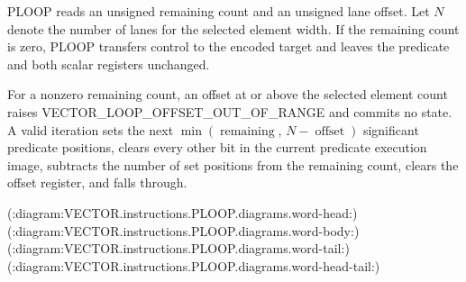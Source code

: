 PLOOP reads an unsigned remaining count and an unsigned lane offset. Let $N$
denote the number of lanes for the selected element width. If the remaining
count is zero, PLOOP transfers control to the encoded target and leaves the
predicate and both scalar registers unchanged.

For a nonzero remaining count, an offset at or above the selected element count
raises VECTOR\_LOOP\_OFFSET\_OUT\_OF\_RANGE and commits no state. A
valid iteration sets the next
$\min(\operatorname{remaining},\,N-\operatorname{offset})$ significant
predicate positions, clears every other bit in the current predicate execution
image, subtracts the number of set positions from
the remaining count, clears the offset register, and falls through.

(:diagram:VECTOR.instructions.PLOOP.diagrams.word-head:)
(:diagram:VECTOR.instructions.PLOOP.diagrams.word-body:)
(:diagram:VECTOR.instructions.PLOOP.diagrams.word-tail:)
(:diagram:VECTOR.instructions.PLOOP.diagrams.word-head-tail:)
